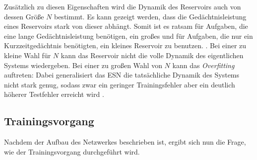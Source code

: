 Zusätzlich zu diesen Eigenschaften wird die Dynamik des Reservoirs auch von dessen Größe $N$ bestimmt. Es kann gezeigt werden, dass die Gedächtnisleistung eines Reservoirs stark von dieser abhängt. Somit ist es ratsam für Aufgaben, die eine lange Gedächtnisleistung benötigen, ein großes und für Aufgaben, die nur ein Kurzzeitgedächtnis benötigten, ein kleines Reservoir zu benutzen. \citep{jeagerTut2002}. Bei einer zu kleine Wahl für $N$ kann das Reservoir nicht die volle Dynamik des eigentlichen Systems wiedergeben. Bei einer zu großen Wahl von $N$ kann das \textit{Overfitting} auftreten: Dabei generalisiert das \textsc{ESN} die tatsächliche Dynamik des Systems nicht stark genug, sodass zwar ein geringer Trainingsfehler aber ein deutlich höherer Testfehler erreicht wird \citep{jeagerTut2002}.


\subsection{Trainingsvorgang}
Nachdem der Aufbau des Netzwerkes beschrieben ist, ergibt sich nun die Frage, wie der Trainingsvorgang durchgeführt wird.

